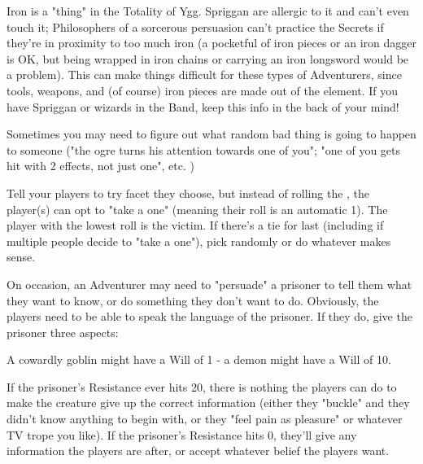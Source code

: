 {

Iron is a "thing" in the Totality of Ygg. Spriggan are allergic to it and can't even touch it; Philosophers of a sorcerous persuasion can't practice the Secrets if they're in proximity to too much iron (a pocketful of iron pieces or an iron dagger is OK, but being wrapped in iron chains or carrying an iron longsword would be a problem).  This can make things difficult for these types of Adventurers, since tools, weapons, and (of course) iron pieces are made out of the element. If you have Spriggan or wizards in the Band, keep this info in the back of your mind!



Sometimes you may need to figure out what random bad thing is going to happen to someone ("the ogre turns his attention towards one of you"; "one of you gets hit with 2 effects, not just one", etc. )

Tell your players to try   facet they choose, but instead of rolling the \UD, the player(s) can opt to "take a one" (meaning their roll is an automatic 1).  The player with the lowest roll is the victim. If there's a tie for last (including if multiple people decide to "take a one"), pick randomly or do whatever makes sense.

\newpage


On occasion, an Adventurer may need to "persuade" a prisoner to tell them what they want to know, or do something they don't want to do. Obviously, the players need to be able to speak the language of the prisoner.  If they do, give the prisoner three aspects: 


A cowardly goblin might have a Will of 1 - a demon might have a Will of 10.

If the prisoner's Resistance ever hits 20, there is nothing the players can do to make the creature give up the correct information (either they "buckle" and they didn't know anything to begin with, or they "feel pain as pleasure" or whatever TV trope you like). If the prisoner's Resistance hits 0, they'll give any information the players are after, or accept whatever belief the players want.

}
